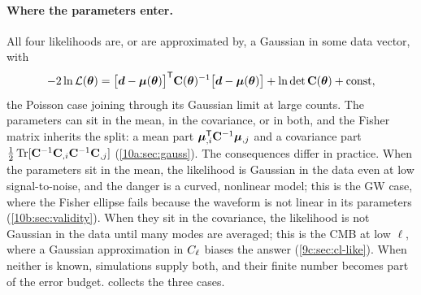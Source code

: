 \paragraph{Where the parameters enter.}
All four likelihoods are, or are approximated by, a Gaussian in some data vector, with
\[
  -2\ln\mathcal{L}(\bm{\theta})=\bigl[\bm{d}-\bm\mu(\bm{\theta})\bigr]^{\mathsf{T}}\mathbf{C}(\bm{\theta})^{-1}\bigl[\bm{d}-\bm\mu(\bm{\theta})\bigr]
  +\ln\det\mathbf{C}(\bm{\theta})+\text{const},
\]
the Poisson case joining through its Gaussian limit at large counts. The parameters can
sit in the mean, in the covariance, or in both, and the Fisher matrix inherits the
split: a mean part $\bm\mu_{,i}^{\mathsf{T}}\mathbf{C}^{-1}\bm\mu_{,j}$ and a covariance part
$\frac12\operatorname{Tr}[\mathbf{C}^{-1}\mathbf{C}_{,i}\mathbf{C}^{-1}\mathbf{C}_{,j}]$ (\cref{10a:sec:gauss}). The
consequences differ in practice. When the parameters sit in the mean, the likelihood is
Gaussian in the data even at low signal-to-noise, and the danger is a curved,
nonlinear model; this is the GW case, where the Fisher ellipse fails because the
waveform is not linear in its parameters (\cref{10b:sec:validity}). When they sit in
the covariance, the likelihood is not Gaussian in the data until many modes are
averaged; this is the CMB at low $\ell$, where a Gaussian approximation in $C_\ell$
biases the answer (\cref{9c:sec:cl-like}). When neither is known, simulations supply
both, and their finite number becomes part of the error budget.
 collects the three cases.

